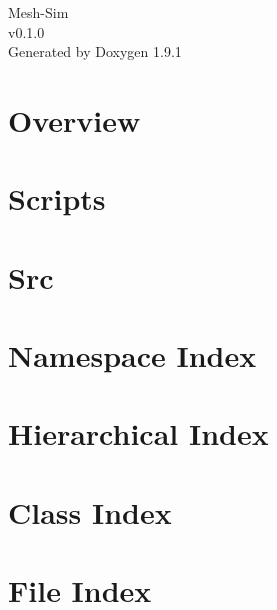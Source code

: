 \let\mypdfximage\pdfximage\def\pdfximage{\immediate\mypdfximage}\documentclass[twoside]{book}
\newcommand{\+}{\discretionary{\mbox{\scriptsize$\hookleftarrow$}}{}{}}
\newcommand{\clearemptydoublepage}{%
  \newpage{\pagestyle{empty}\cleardoublepage}%
}
\begin{document}
\raggedbottom

\hypersetup{pageanchor=false,
             bookmarksnumbered=true,
             pdfencoding=unicode
            }
\begin{titlepage}
\vspace*{7cm}
\begin{center}%
{\Large Mesh-\/\+Sim \\[1ex]\large v0.\+1.\+0 }\\
\vspace*{1cm}
{\large Generated by Doxygen 1.9.1}\\
\end{center}
\end{titlepage}
\clearemptydoublepage
{}
\tableofcontents
\clearemptydoublepage
{}
\hypersetup{pageanchor=true}

\chapter{Overview}
\label{index}\hypertarget{index}{}
\chapter{Scripts}
\label{scripts}

\chapter{Src}
\label{src}

\chapter{Namespace Index}

\chapter{Hierarchical Index}

\chapter{Class Index}

\chapter{File Index}

\end{document}
